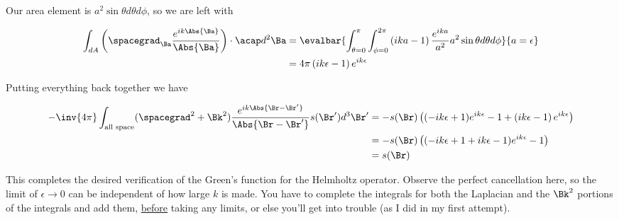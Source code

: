 Our area element is $a^2 \sin\theta d\theta d\phi$, so we are left with

\begin{align*}
\int_{dA} \left( \spacegrad_\Ba \frac{e^{i k \Abs{\Ba}}}{\Abs{\Ba}} \right) \cdot \acap d^2 \Ba 
&=
\evalbar{
\int_{\theta = 0}^\pi \int_{\phi=0}^{2\pi}
\left( i k a - 1 \right)
\frac{e^{i k a}}{a^2}
a^2 \sin\theta d\theta d\phi 
}{a = \epsilon}
\\
&=
4 \pi
\left( i k \epsilon - 1 \right) e^{i k \epsilon}
\end{align*}

Putting everything back together we have

\begin{align*}
-\inv{4\pi} \int_{\text{all space}} (\spacegrad^2 + \Bk^2) \frac{e^{i k \Abs{\Br - \Br'}}}{\Abs{\Br - \Br'}} s(\Br') d^3 \Br'
&=
-s(\Br)
\left(
(-i k \epsilon + 1)e^{i k \epsilon} - 1 
+\left( i k \epsilon - 1 \right) e^{i k \epsilon}
\right) \\
&=
-s(\Br)
\left(
(-i k \epsilon + 1 + i k \epsilon - 1 )e^{i k \epsilon} - 1 
\right) \\
&=
s(\Br)
\end{align*}

This completes the desired verification of the Green's function for the Helmholtz operator.  Observe the perfect cancellation here, so the limit of $\epsilon \rightarrow 0$ can be independent of how large $k$ is made.  You have to complete the integrals for both the Laplacian and the $\Bk^2$ portions of the integrals and add them, \underline{before} taking any limits, or else you'll get into trouble (as I did in my first attempt).

\EndArticle
